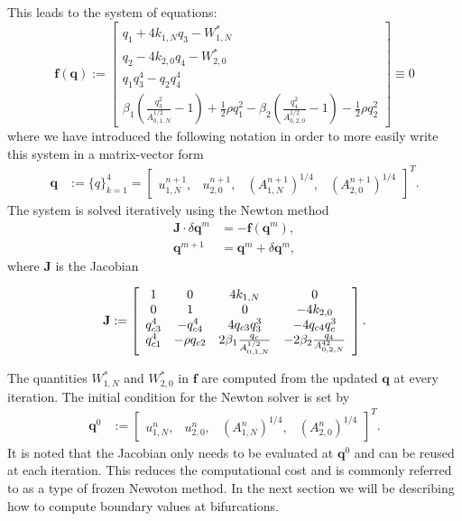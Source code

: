 \documentclass[a4paper, oneside]{discothesis}
\begin{document}
	This leads to the system of equations:
	\begin{equation}
		\mathbf{f}(\mathbf{q}) := \left[\begin{array}{c}
				q_{1}+4 k_{1,N} q_{3}-W_{1,N}^* \\
				q_{2}-4 k_{2,0} q_{4}-W_{2,0}^* \\
				q_{1} q_{3}^4-q_{2} q_{4}^4 \\
				\beta_1\left(\frac{q_{3}^2}{A_{0,1,N}^{1 / 2}}-1\right)+\frac{1}{2} \rho q_{1}^2-\beta_2\left(\frac{q_{4}^2}{A_{0,2,0}^{1 / 2}}-1\right)-\frac{1}{2} \rho q_{2}^2
		\end{array}\right] \equiv 0
	\end{equation}
	where we have introduced the following notation in order to more easily write this system in a matrix-vector form
	\begin{align}
		\mathbf{q}&:= \{q\}_{k=1}^4 = \left[\begin{array}{llll}
				u_{1,N}^{n+1}, & u_{2,0}^{n+1}, & \left( A_{1,N}^{n+1}\right)^{1 / 4}, & \left( A_{2,0}^{n+1} \right)^{1 / 4}
		\end{array}\right]^T. 
			\end{align}
			The system is solved iteratively using the Newton method
			\begin{align}
				\mathbf{J} \cdot \delta \mathbf{q}^m &= -\mathbf{f}\left(\mathbf{q}^m\right), \\
				\mathbf{q}^{m+1} &= \mathbf{q}^m+\delta \mathbf{q}^m,
			\end{align}
			where $\mathbf{J}$ is the Jacobian

			\begin{equation}
				\mathbf{J}:=\left[\begin{array}{c c c c}{{{1}}}&{{0}}&{{{4}k_{1,N}}}&{{0}}\\ {{0}}&{{{1}}}&{{0}}&{{-4k_{2,0}}}\\ {{q_{c3}^{4}}}&{{-q_{c4}^{4}}}&{{4q_{c3}q_{3}^{3}}}&{{-4q_{c4}q_{c}^{3}}}\\ {{q_{c1}^{4}}}&{{-\rho q_{c2}}}&{{2\beta_{1}\frac{q_{c}}{A_{0,1,N}^{1/2}}}}&{{-2\beta_{2}\frac{q_{4}}{A_{0,2,N}^{42}}}}\end{array}\right].
			\end{equation}

			The quantities $W_{1,N}^*$ and $W_{2,0}^*$ in $\mathbf{f}$ are computed from the updated $\mathbf{q}$ at every iteration.
			The initial condition for the Newton solver is set by
			\begin{align}
				\mathbf{q}^0&:=\left[\begin{array}{llll}
						u_{1,N}^{n}, & u_{2,0}^{n}, & \left( A_{1,N}^{n}\right)^{1 / 4}, & \left( A_{2,0}^{n} \right)^{1 / 4}
				\end{array}\right]^T.
					\end{align}
					It is noted that the Jacobian only needs to be evaluated at $\mathbf{q}^0$ and can be reused at each iteration.
					This reduces the computational cost and is commonly referred to as a type of frozen Newoton method. \cite{jin2010class,amat2013maximum,amat2018two}
					In the next section we will be describing how to compute boundary values at bifurcations.
\end{document}
